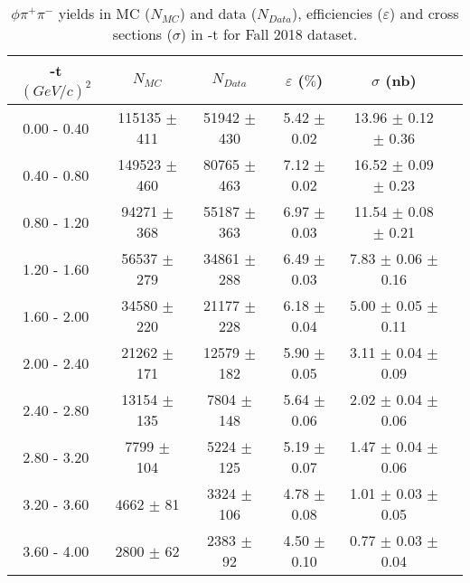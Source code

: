 \begin{center}
\begin{table}[H]
    \centering
    \caption{$\phi \pi^{+}\pi^{-}$ yields in MC ($N_{MC}$) and data ($N_{Data}$), efficiencies ($\varepsilon$) and cross sections ($\sigma$) in $\mbox{-t}$ for Fall 2018 dataset.}
    \label{tab.y2175.xsec_ul.phi2pi.4.2}
    \begin{tabular}{|c|c|c|c|c|c|}
    \hline
    -t $(GeV/c)^{2}$ & $N_{MC}$ & $N_{Data}$ & $\varepsilon$ ($\%$) & $\sigma$ (nb) \\ 
    \hline
    0.00 - 0.40 & 115135 $\pm$ 411 & 51942 $\pm$ 430 & 5.42 $\pm$ 0.02 & 13.96 $\pm$ 0.12 $\pm$ 0.36 \\ 
    0.40 - 0.80 & 149523 $\pm$ 460 & 80765 $\pm$ 463 & 7.12 $\pm$ 0.02 & 16.52 $\pm$ 0.09 $\pm$ 0.23 \\ 
    0.80 - 1.20 & 94271 $\pm$ 368 & 55187 $\pm$ 363 & 6.97 $\pm$ 0.03 & 11.54 $\pm$ 0.08 $\pm$ 0.21 \\ 
    1.20 - 1.60 & 56537 $\pm$ 279 & 34861 $\pm$ 288 & 6.49 $\pm$ 0.03 & 7.83 $\pm$ 0.06 $\pm$ 0.16 \\ 
    1.60 - 2.00 & 34580 $\pm$ 220 & 21177 $\pm$ 228 & 6.18 $\pm$ 0.04 & 5.00 $\pm$ 0.05 $\pm$ 0.11 \\ 
    2.00 - 2.40 & 21262 $\pm$ 171 & 12579 $\pm$ 182 & 5.90 $\pm$ 0.05 & 3.11 $\pm$ 0.04 $\pm$ 0.09 \\ 
    2.40 - 2.80 & 13154 $\pm$ 135 & 7804 $\pm$ 148 & 5.64 $\pm$ 0.06 & 2.02 $\pm$ 0.04 $\pm$ 0.06 \\ 
    2.80 - 3.20 & 7799 $\pm$ 104 & 5224 $\pm$ 125 & 5.19 $\pm$ 0.07 & 1.47 $\pm$ 0.04 $\pm$ 0.06 \\ 
    3.20 - 3.60 & 4662 $\pm$ 81 & 3324 $\pm$ 106 & 4.78 $\pm$ 0.08 & 1.01 $\pm$ 0.03 $\pm$ 0.05 \\ 
    3.60 - 4.00 & 2800 $\pm$ 62 & 2383 $\pm$ 92 & 4.50 $\pm$ 0.10 & 0.77 $\pm$ 0.03 $\pm$ 0.04 \\  
   \hline
\end{tabular}
\end{table}
\end{center}

